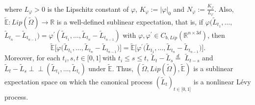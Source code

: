 \documentclass[a4paper,oneside,10pt]{article}%
\numberwithin{equation}{section}
\begin{document}
where $L_{\varphi}>0$ is the Lipschitz constant of $\varphi$, $K_{\varphi
}:=|\varphi|_{0}$ and $N_{\varphi}:=\frac{K_{\varphi}}{L_{\varphi}}$.
Also, $\mathbb{\tilde{E}}:Lip(\tilde{\Omega})\rightarrow \mathbb{R}$ is a
well-defined sublinear expectation, that is, if $\varphi(\tilde{L}_{t_{1}%
},\ldots,$ $\tilde{L}_{t_{n}}-\tilde{L}_{t_{n-1}})=\varphi^{\prime}(\tilde
{L}_{t_{1}},\ldots,\tilde{L}_{t_{n}}-\tilde{L}_{t_{n-1}})$ with $\varphi
,\varphi^{\prime}\in C_{b,Lip}(\mathbb{R}^{n\times3d})$, then
\[
\mathbb{\tilde{E}}\big[\varphi \big(\tilde{L}_{t_{1}},\ldots,\tilde{L}_{t_{n}%
}-\tilde{L}_{t_{n-1}}\big)\big]=\mathbb{\tilde{E}}\big[\varphi^{\prime
}\big(\tilde{L}_{t_{1}},\ldots,\tilde{L}_{t_{n}}-\tilde{L}_{t_{n-1}%
}\big)\big].
\]
Moreover, for each $t_{i},s,t\in \lbrack0,1]\ $with $t_{i}\leq s\leq t$,
$\tilde{L}_{t}-\tilde{L}_{s}\overset{d}{=}$ $\tilde{L}_{t-s}$ and $\tilde
{L}_{t}-\tilde{L}_{s}\perp \! \! \! \perp(\tilde{L}_{t_{1}},\ldots,\tilde
{L}_{t_{i}})$ under $\mathbb{\tilde{E}}$. Thus, $(\tilde{\Omega}%
,Lip(\tilde{\Omega}),\mathbb{\tilde{E}})$ is a sublinear expectation space on
which the canonical process $(\tilde{L}_{t})_{t\in \lbrack0,1]}$ is a nonlinear
L\'{e}vy process.

\end{document}
